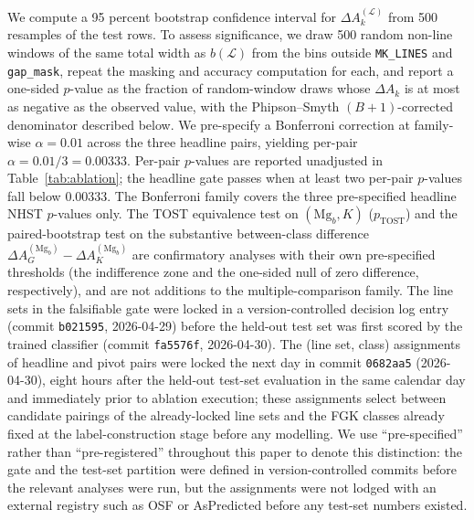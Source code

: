 \documentclass[11pt,a4paper]{article}
\newcommand{\dA}{\Delta A}
\begin{document}
We compute a 95 percent bootstrap confidence interval for $\dA_k^{(\mathcal{L})}$ from 500 resamples of the test rows. To assess significance, we draw 500 random non-line windows of the same total width as $b(\mathcal{L})$ from the bins outside \texttt{MK\_LINES} and \texttt{gap\_mask}, repeat the masking and accuracy computation for each, and report a one-sided $p$-value as the fraction of random-window draws whose $\dA_k$ is at most as negative as the observed value, with the Phipson--Smyth $(B+1)$-corrected denominator described below. We pre-specify a Bonferroni correction at family-wise $\alpha = 0.01$ across the three headline pairs, yielding per-pair $\alpha = 0.01 / 3 = 0.00333$. Per-pair $p$-values are reported unadjusted in Table~\ref{tab:ablation}; the headline gate passes when at least two per-pair $p$-values fall below $0.00333$. The Bonferroni family covers the three pre-specified headline NHST $p$-values only. The TOST equivalence test on $(\mathrm{Mg}_b, K)$ ($p_{\mathrm{TOST}}$) and the paired-bootstrap test on the substantive between-class difference $\dA_G^{(\mathrm{Mg}_b)} - \dA_K^{(\mathrm{Mg}_b)}$ are confirmatory analyses with their own pre-specified thresholds (the indifference zone and the one-sided null of zero difference, respectively), and are not additions to the multiple-comparison family. The line sets in the falsifiable gate were locked in a version-controlled decision log entry (commit \texttt{b021595}, 2026-04-29) before the held-out test set was first scored by the trained classifier (commit \texttt{fa5576f}, 2026-04-30). The (line set, class) assignments of headline and pivot pairs were locked the next day in commit \texttt{0682aa5} (2026-04-30), eight hours after the held-out test-set evaluation in the same calendar day and immediately prior to ablation execution; these assignments select between candidate pairings of the already-locked line sets and the FGK classes already fixed at the label-construction stage before any modelling. We use ``pre-specified'' rather than ``pre-registered'' throughout this paper to denote this distinction: the gate and the test-set partition were defined in version-controlled commits before the relevant analyses were run, but the assignments were not lodged with an external registry such as OSF or AsPredicted before any test-set numbers existed.
\end{document}
